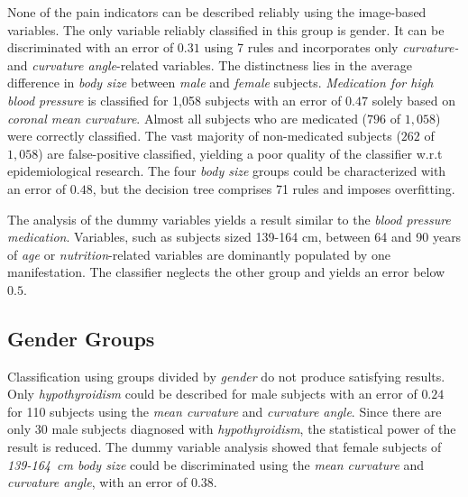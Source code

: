 \documentclass[a4paper,twoside]{style/article}
\begin{document}
None of the pain indicators can be described reliably using the image-based variables.
The only variable reliably classified in this group is gender. %
%
It can be discriminated with an error of $0.31$ using 7 rules and incorporates only \emph{curvature-} and \emph{curvature angle}-related variables.
The distinctness lies in the average difference in \emph{body size} between \emph{male} and \emph{female} subjects.
%
\emph{Medication for high blood pressure} is classified for 1,058 subjects with an error of $0.47$ solely based on \emph{coronal mean curvature}.
Almost all subjects who are medicated ($796$ of $1,058$) were correctly classified.
The vast majority of non-medicated subjects ($262$ of $1,058$) are false-positive classified, yielding a poor quality of the classifier w.r.t epidemiological research.
The four \emph{body size} groups could be characterized with an error of $0.48$, but the decision tree comprises 71 rules and imposes overfitting.

The analysis of the dummy variables yields a result similar to the \emph{blood pressure medication}.
Variables, such as subjects sized 139-164 cm, between 64 and 90 years of \emph{age} or \emph{nutrition}-related variables are dominantly populated by one manifestation.
The classifier neglects the other group and yields an error below $0.5$.
\subsection{Gender Groups}
Classification using groups divided by \emph{gender} do not produce satisfying results.
Only \emph{hypothyroidism} could be described for male subjects with an error of $0.24$ for 110 subjects using the \emph{mean curvature} and \emph{curvature angle}.
Since there are only 30 male subjects diagnosed with \emph{hypothyroidism}, the statistical power of the result is reduced.
The dummy variable analysis showed that female subjects of \emph{139-164~cm body size} could be discriminated using the \emph{mean curvature} and \emph{curvature angle}, with an error of $0.38$.
\end{document}
